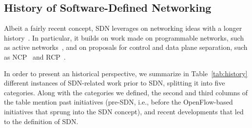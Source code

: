 \subsection{History of Software-Defined Networking}

Albeit a fairly recent concept, SDN leverages on networking ideas with a longer history~\cite{feamster2013-2}.
In particular, it builds on work made on programmable networks, such as active networks~\cite{tennenhouse1997}, and on proposals for control and data plane separation, such as NCP~\cite{sheinbein1982} and RCP~\cite{caesar2005}.

In order to present an historical perspective, we summarize in Table~\ref{tab:history} different instances of SDN-related work prior to SDN, splitting it into five categories.
Along with the categories we defined, the second and third columns of the table mention past initiatives (pre-SDN, i.e., before the OpenFlow-based initiatives that sprung into the SDN concept), and recent developments that led to the definition of SDN.


